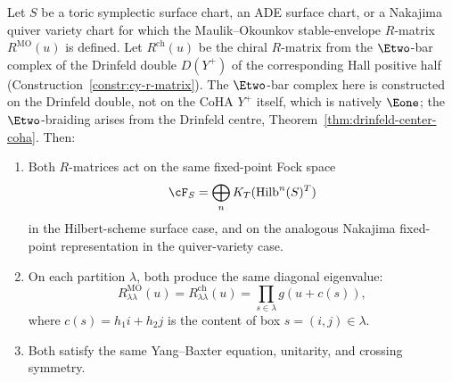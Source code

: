 \begin{theorem}
\label{thm:mo-chiral-rmatrix}
Let \(S\) be a toric symplectic surface chart, an ADE surface chart, or
a Nakajima quiver variety chart for which the Maulik--Okounkov
stable-envelope \(R\)-matrix \(R^{\mathrm{MO}}(u)\) is defined.  Let
\(R^{\mathrm{ch}}(u)\) be the chiral \(R\)-matrix from the \(\Etwo\)-bar
complex of the Drinfeld double \(D(Y^+)\) of the corresponding Hall
positive half (Construction~\ref{constr:cy-r-matrix}).  The \(\Etwo\)-bar
complex here is constructed on the Drinfeld double, not on the CoHA
\(Y^+\) itself, which is natively \(\Eone\); the \(\Etwo\)-braiding
arises from the Drinfeld centre, Theorem~\ref{thm:drinfeld-center-coha}.
Then:
\begin{enumerate}[label=(\roman*)]
 \item Both \(R\)-matrices act on the same fixed-point Fock space
 \[
   \cF_S=\bigoplus_n K_T(\mathrm{Hilb}^n(S)^T)
 \]
 in the Hilbert-scheme surface case, and on the analogous Nakajima
 fixed-point representation in the quiver-variety case.
 \item On each partition $\lambda$, both produce the same diagonal eigenvalue:
 \[
 R^{\mathrm{MO}}_{\lambda\lambda}(u) = R^{\mathrm{ch}}_{\lambda\lambda}(u) = \prod_{s \in \lambda} g(u + c(s)),
 \]
 where $c(s) = h_1 i + h_2 j$ is the content of box $s = (i,j) \in \lambda$.
 \item Both satisfy the same Yang--Baxter equation, unitarity, and crossing symmetry.
\end{enumerate}
\end{theorem}

